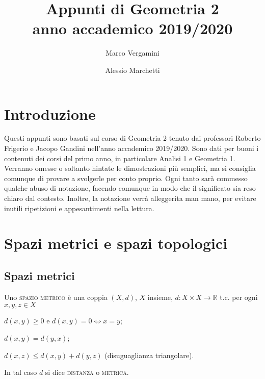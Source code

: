 \documentclass{article}
\title{Appunti di Geometria 2 \\ anno accademico 2019/2020}
\date{}
\author{Marco Vergamini \and Alessio Marchetti}
\begin{document}
\maketitle
\newpage
\tableofcontents
\newpage

\section{Introduzione}
Questi appunti sono basati sul corso di Geometria 2 tenuto dai professori
Roberto Frigerio e Jacopo Gandini nell'anno accademico 2019/2020. Sono dati per
buoni i contenuti dei corsi del primo anno, in particolare Analisi 1 e Geometria
1. Verranno omesse o soltanto hintate le dimostrazioni più semplici, ma si
consiglia comunque di provare a svolgerle per conto proprio. Ogni tanto sarà
commesso qualche abuso di notazione, facendo comunque in modo che il significato
sia reso chiaro dal contesto. Inoltre, la notazione verrà alleggerita man mano,
per evitare inutili ripetizioni e appesantimenti nella lettura.


\section{Spazi metrici e spazi topologici}
\subsection{Spazi metrici}
\begin{defn}
	Uno \textsc{spazio metrico} è una coppia $(X, d)$, $X$ insieme,
	${d: X \times X \rightarrow \mathbb{R}}$ t.c. per ogni ${x, y, z \in X}$
    \begin{nlist}
	\item $d(x, y) \ge 0$ e $d(x, y)=0 \Leftrightarrow x=y$;
	\item $d(x, y)=d(y, x)$;
	\item $d(x, z) \le d(x, y)+d(y,z)$ (disuguaglianza triangolare).
    \end{nlist}
	In tal caso $d$ si dice \textsc{distanza} o \textsc{metrica}.
\end{defn}
\end{document}
